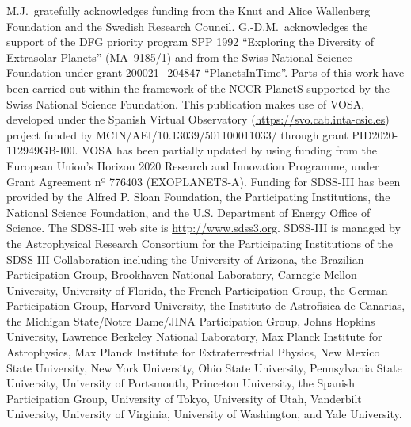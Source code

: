 \documentclass{aa}
\begin{document}
\begin{acknowledgements}
M.J.\ gratefully acknowledges funding from the Knut and Alice Wallenberg Foundation and the Swedish Research Council.
G.-D.M.\ acknowledges the support of the DFG priority program SPP 1992 ``Exploring the Diversity of Extrasolar Planets'' (MA~9185/1) and from the Swiss National Science Foundation under grant 200021\_204847 ``PlanetsInTime''.
Parts of this work have been carried out within the framework of the NCCR PlanetS supported by the Swiss National Science Foundation.
%
This publication makes use of VOSA, developed under the Spanish Virtual Observatory (\url{https://svo.cab.inta-csic.es}) project funded by MCIN/AEI/10.13039/501100011033/ through grant PID2020-112949GB-I00. 
VOSA has been partially updated by using funding from the European Union's Horizon 2020 Research and Innovation Programme, under Grant Agreement nº 776403 (EXOPLANETS-A).
Funding for SDSS-III has been provided by the Alfred P. Sloan Foundation, the Participating Institutions, the National Science Foundation, and the U.S. Department of Energy Office of Science. The SDSS-III web site is \url{http://www.sdss3.org}. SDSS-III is managed by the Astrophysical Research Consortium for the Participating Institutions of the SDSS-III Collaboration including the University of Arizona, the Brazilian Participation Group, Brookhaven National Laboratory, Carnegie Mellon University, University of Florida, the French Participation Group, the German Participation Group, Harvard University, the Instituto de Astrofisica de Canarias, the Michigan State/Notre Dame/JINA Participation Group, Johns Hopkins University, Lawrence Berkeley National Laboratory, Max Planck Institute for Astrophysics, Max Planck Institute for Extraterrestrial Physics, New Mexico State University, New York University, Ohio State University, Pennsylvania State University, University of Portsmouth, Princeton University, the Spanish Participation Group, University of Tokyo, University of Utah, Vanderbilt University, University of Virginia, University of Washington, and Yale University.
\end{acknowledgements}

 

 
\end{document}
